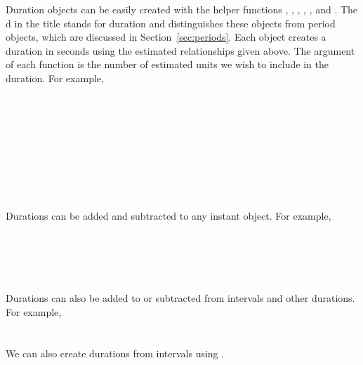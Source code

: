 \documentclass[article]{jss}
\begin{document}
Duration objects can be easily created with the helper functions 
, , , , , and  . The d in the title stands for duration and distinguishes these objects from period objects, which are discussed in Section~\ref{sec:periods}. Each object creates a duration in seconds using the estimated relationships given above. The argument of each function is the number of estimated units we wish to include in the duration. For example,\\

\\
\\

\\
\\

\\
\\

\\
\\
\\

Durations can be added and subtracted to any instant object. For example,\\

\\
\\

\\
\\
\\

Durations can also be added to or subtracted from intervals and other durations. For example,\\

\\
\\

We can also create durations from intervals using . 

\\
\\
\end{document}
